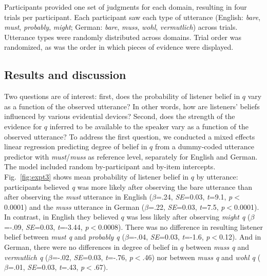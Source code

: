 \documentclass[11pt]{article}
\begin{document}
Participants provided one set of judgments for each domain, resulting in four trials per participant. Each participant saw each type of utterance (English: \emph{bare}, \emph{must}, \emph{probably}, \emph{might}; German: \emph{bare}, \emph{muss}, \emph{wohl}, \emph{vermutlich}) across trials. Utterance types were randomly distributed across domains. Trial order was randomized, as was the order in which pieces of evidence were displayed.


\subsection{Results and discussion}

Two questions are of interest: first, does the probability of listener belief in $q$ vary as a function of the observed utterance? In other words, how are listeners' beliefs influenced by various evidential devices? Second, does the strength of the evidence for $q$ inferred to be available to the speaker vary as a function of the observed utterance? To address the first question, we conducted a mixed effects linear regression predicting degree of belief in $q$ from a dummy-coded utterance predictor with \emph{must}/\emph{muss} as reference level, separately for English and German. The model included random by-participant and by-item intercepts. Fig.~\ref{fig:expt3} shows mean probability of listener belief in $q$ by utterance: participants believed \emph{q} was more likely after observing the bare utterance than after observing the \emph{must} utterance in English  ($\beta$=.24, \emph{SE}=0.03, \emph{t}=9.1, \emph{p}$<$0.0001) and the \emph{muss} utterance in German ($\beta$=.22, \emph{SE}=0.03, \emph{t}=7.5, \emph{p}$<$0.0001). In contrast, in English they believed $q$ was less likely after observing \emph{might q} ($\beta$=-.09, \emph{SE}=0.03, \emph{t}=-3.44, \emph{p}$<$0.0008). There was no difference in resulting listener belief between \emph{must q} and \emph{probably q} ($\beta$=-.04, \emph{SE}=0.03, \emph{t}=-1.6, \emph{p}$<$0.12). And in German, there were no differences in degree of belief in $q$ between \emph{muss q} and \emph{vermutlich q} ($\beta$=-.02, \emph{SE}=0.03, \emph{t}=-.76, \emph{p}$<$.46) nor between \emph{muss q} and \emph{wohl q} ($\beta$=.01, \emph{SE}=0.03, \emph{t}=.43, \emph{p}$<$.67). %
\end{document}
